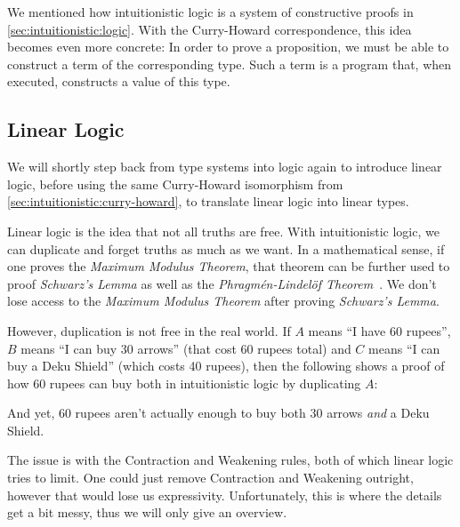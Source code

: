 \documentclass[sigplan,11pt,screen,nonacm]{acmart}
\begin{document}
We mentioned how intuitionistic logic is a system of constructive proofs in \cref{sec:intuitionistic:logic}. With the Curry-Howard correspondence, this idea becomes even more concrete: In order to prove a proposition, we must be able to construct a term of the corresponding type. Such a term is a program that, when executed, constructs a value of this type.

\subsection{Linear Logic} \label{sec:linear:logic}

We will shortly step back from type systems into logic again to introduce linear logic, before using the same Curry-Howard isomorphism from \cref{sec:intuitionistic:curry-howard}, to translate linear logic into linear types.

Linear logic is the idea that not all truths are free. With intuitionistic logic, we can duplicate and forget truths as much as we want. In a mathematical sense, if one proves the \emph{Maximum Modulus Theorem}, that theorem can be further used to proof \emph{Schwarz's Lemma} as well as the \emph{Phragmén-Lindelöf Theorem}~\cite{conway-complex}. We don't lose access to the \emph{Maximum Modulus Theorem} after proving \emph{Schwarz's Lemma}.

However, duplication is not free in the real world. If \(A\) means \enquote{I have 60 rupees}, \(B\) means \enquote{I can buy 30 arrows} (that cost 60 rupees total) and \(C\) means \enquote{I can buy a Deku Shield} (which costs 40 rupees), then the following shows a proof of how 60 rupees can buy both in intuitionistic logic by duplicating \(A\):
\begin{center}
  \begin{prooftree}
  \end{prooftree}
\end{center}
And yet, 60 rupees aren't actually enough to buy both 30 arrows \emph{and} a Deku Shield.

The issue is with the Contraction and Weakening rules, both of which linear logic tries to limit. One could just remove Contraction and Weakening outright, however that would lose us expressivity. Unfortunately, this is where the details get a bit messy, thus we will only give an overview.
\end{document}
